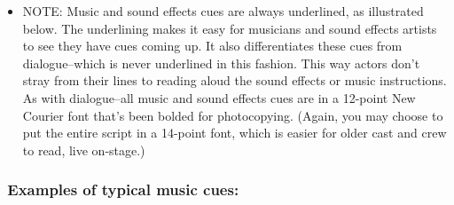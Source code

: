 \documentclass[openleft,oneside,showtrims]{memoir}
\begin{document}
\begin{itemize}
\item NOTE: Music and sound effects cues are always underlined, as illustrated below. The underlining makes it easy for musicians and sound effects artists to see they have cues coming up. It also differentiates these cues from dialogue--which is never underlined in this fashion. This way actors don't stray from their lines to reading aloud the sound effects or music instructions. As with dialogue--all music and sound effects cues are in a 12-point New Courier font that's been bolded for photocopying. (Again, you may choose to put the entire script in a 14-point font, which is easier for older cast and crew to read, live on-stage.)
\end{itemize}

\subsubsection*{ Examples of typical music cues:}
\label{sec:org96508f7}
\end{document}
